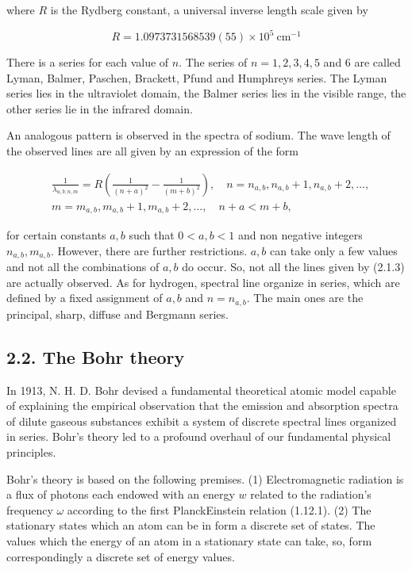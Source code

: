 \documentclass{article}
\begin{document}
where $R$ is the Rydberg constant, a universal inverse length scale given by
 
\begin{equation*}
R=1.0973731568539(55) \times 10^{5} \mathrm{~cm}^{-1} \tag{2.1.2}
\end{equation*}
 

There is a series for each value of $n$. The series of $n=1,2,3,4,5$ and 6 are called Lyman, Balmer, Paschen, Brackett, Pfund and Humphreys series. The Lyman series lies in the ultraviolet domain, the Balmer series lies in the visible range, the other series lie in the infrared domain.

An analogous pattern is observed in the spectra of sodium. The wave length of the observed lines are all given by an expression of the form
 
\begin{align*}
& \frac{1}{\lambda_{a, b ; n, m}}=R\left(\frac{1}{(n+a)^{2}}-\frac{1}{(m+b)^{2}}\right), \quad n=n_{a, b}, n_{a, b}+1, n_{a, b}+2, \ldots,  \tag{2.1.3}\\
& m=m_{a, b}, m_{a, b}+1, m_{a, b}+2, \ldots, \quad n+a<m+b,
\end{align*}
 
for certain constants $a, b$ such that $0<a, b<1$ and non negative integers $n_{a, b}, m_{a, b}$. However, there are further restrictions. $a, b$ can take only a few values and not all the combinations of $a, b$ do occur. So, not all the lines given by (2.1.3) are actually observed. As for hydrogen, spectral line organize in series, which are defined by a fixed assignment of $a, b$ and $n=n_{a, b}$. The main ones are the principal, sharp, diffuse and Bergmann series.

\subsection*{2.2. The Bohr theory}

In 1913, N. H. D. Bohr devised a fundamental theoretical atomic model capable of explaining the empirical observation that the emission and absorption spectra of dilute gaseous substances exhibit a system of discrete spectral lines organized in series. Bohr's theory led to a profound overhaul of our fundamental physical principles.

Bohr's theory is based on the following premises.
(1) Electromagnetic radiation is a flux of photons each endowed with an energy $w$ related to the radiation's frequency $\omega$ according to the first PlanckEinstein relation (1.12.1).
(2) The stationary states which an atom can be in form a discrete set of states. The values which the energy of an atom in a stationary state can take, so, form correspondingly a discrete set of energy values.
\end{document}

